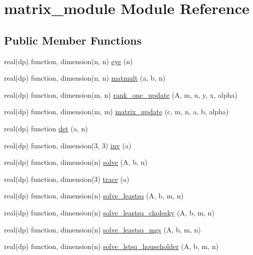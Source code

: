 \hypertarget{classmatrix__module}{\section{matrix\-\_\-module Module Reference}
\label{classmatrix__module}
}
\subsection*{Public Member Functions}
\begin{DoxyCompactItemize}
\item 
real(dp) function, dimension(n, n) \hyperlink{classmatrix__module_a5d18b03838a0ba41d729284188c492cb}{eye} (n)
\item 
real(dp) function, dimension(n, n) \hyperlink{classmatrix__module_af69a49d66c94be6592dcb58fca86bdf3}{matmult} (a, b, n)
\item 
real(dp) function, dimension(m, n) \hyperlink{classmatrix__module_a8bf812de99eb57e458068660b1f18489}{rank\-\_\-one\-\_\-update} (A, m, n, y, x, alpha)
\item 
real(dp) function, dimension(m, m) \hyperlink{classmatrix__module_ad5e55e5a4eb29b1279b288d6be4ceaf1}{matrix\-\_\-update} (c, m, n, a, b, alpha)
\item 
real(dp) function \hyperlink{classmatrix__module_a26938657b164b2fef543f9bf9970e221}{det} (a, n)
\item 
real(dp) function, dimension(3, 3) \hyperlink{classmatrix__module_a6385f30e4a8d81b4c1b56b4820ed3062}{inv} (a)
\item 
real(dp) function, dimension(n) \hyperlink{classmatrix__module_a4d090697eec2099b42a72fe48550a55e}{solve} (A, b, n)
\item 
real(dp) function, dimension(3) \hyperlink{classmatrix__module_aad2aea6b95c3ce754cc05060dabad632}{trace} (a)
\item 
real(dp) function, dimension(n) \hyperlink{classmatrix__module_a804a60dba1b7d188e9cb4e7e8eddaa73}{solve\-\_\-leastsq} (A, b, m, n)
\item 
real(dp) function, dimension(n) \hyperlink{classmatrix__module_a27ddd157e0994bf1ac433571b5247f42}{solve\-\_\-leastsq\-\_\-cholesky} (A, b, m, n)
\item 
real(dp) function, dimension(n) \hyperlink{classmatrix__module_aaccd5f8cce3be8bdb46a6b915b72b5f5}{solve\-\_\-leastsq\-\_\-mgs} (A, b, m, n)
\item 
real(dp) function, dimension(n) \hyperlink{classmatrix__module_a6d1f6ce16d73eb003d5d4254a5c57f86}{solve\-\_\-lstsq\-\_\-householder} (A, b, m, n)

\end{DoxyCompactItemize}
